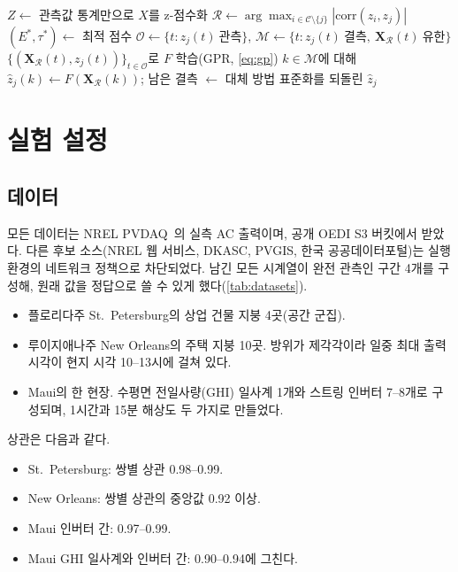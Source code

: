 \documentclass[11pt,a4paper]{article}
\begin{document}
\begin{algorithm}[t]
\caption{결측 시계열 하나에 대한 FPRM 복원(본 구현)}\label{alg:fprm}
$Z \leftarrow$ 관측값 통계만으로 $X$를 z-점수화\;
$\mathcal{R} \leftarrow \arg\max_{i\in\mathcal{C}\setminus\{j\}} |\mathrm{corr}(z_i,z_j)|$ 
$(E^*,\tau^*) \leftarrow$ 최적 점수\;
$\mathcal{O}\leftarrow\{t: z_j(t)\ \text{관측}\}$, $\mathcal{M}\leftarrow\{t: z_j(t)\ \text{결측},\ \mathbf{X}_{\mathcal{R}}(t)\ \text{유한}\}$\;
$\{(\mathbf{X}_{\mathcal{R}}(t), z_j(t))\}_{t\in\mathcal{O}}$로 $F$ 학습(GPR, \cref{eq:gp})\;
$k\in\mathcal{M}$에 대해 $\hat z_j(k) \leftarrow F(\mathbf{X}_{\mathcal{R}}(k))$; 남은 결측 $\leftarrow$ 대체 방법\;
\Return 표준화를 되돌린 $\hat z_j$\;
\end{algorithm}

\section{실험 설정}\label{sec:setup}

\subsection{데이터}

모든 데이터는 NREL PVDAQ~\cite{pvdaq}의 실측 AC 출력이며, 공개 OEDI S3 버킷에서 받았다.
다른 후보 소스(NREL 웹 서비스, DKASC, PVGIS, 한국 공공데이터포털)는 실행 환경의 네트워크 정책으로 차단되었다.
남긴 모든 시계열이 완전 관측인 구간 4개를 구성해, 원래 값을 정답으로 쓸 수 있게 했다(\cref{tab:datasets}).
\begin{itemize}
  \item 플로리다주 St.\ Petersburg의 상업 건물 지붕 4곳(공간 군집).
  \item 루이지애나주 New Orleans의 주택 지붕 10곳. 방위가 제각각이라 일중 최대 출력 시각이 현지 시각 10--13시에 걸쳐 있다.
  \item Maui의 한 현장. 수평면 전일사량(GHI) 일사계 1개와 스트링 인버터 7--8개로 구성되며, 1시간과 15분 해상도 두 가지로 만들었다.
\end{itemize}
상관은 다음과 같다.
\begin{itemize}
  \item St.\ Petersburg: 쌍별 상관 0.98--0.99.
  \item New Orleans: 쌍별 상관의 중앙값 0.92 이상.
  \item Maui 인버터 간: 0.97--0.99.
  \item Maui GHI 일사계와 인버터 간: 0.90--0.94에 그친다.
\end{itemize}
\end{document}
